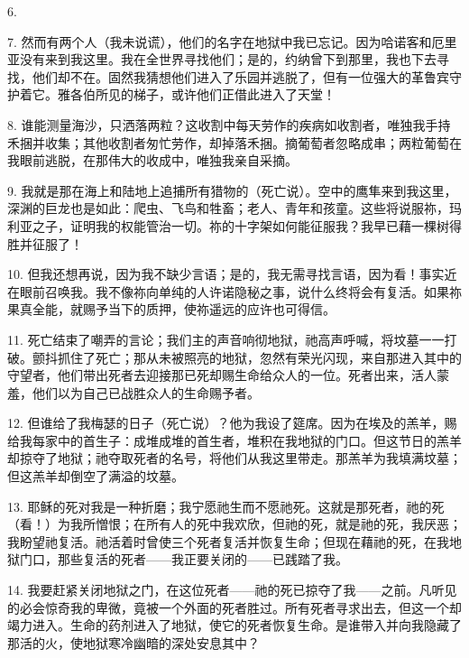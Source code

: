 6. \par

7. 然而有两个人（我未说谎），他们的名字在地狱中我已忘记。因为哈诺客和厄里亚没有来到我这里。我在全世界寻找他们；是的，约纳曾下到那里，我也下去寻找，他们却不在。固然我猜想他们进入了乐园并逃脱了，但有一位强大的革鲁宾守护着它。雅各伯所见的梯子，或许他们正借此进入了天堂！\par

8. 谁能测量海沙，只洒落两粒？这收割中每天劳作的疾病如收割者，唯独我手持禾捆并收集；其他收割者匆忙劳作，却掉落禾捆。摘葡萄者忽略成串；两粒葡萄在我眼前逃脱，在那伟大的收成中，唯独我亲自采摘。\par

9. 我就是那在海上和陆地上追捕所有猎物的（死亡说）。空中的鹰隼来到我这里，深渊的巨龙也是如此：爬虫、飞鸟和牲畜；老人、青年和孩童。这些将说服祢，玛利亚之子，证明我的权能管治一切。祢的十字架如何能征服我？我早已藉一棵树得胜并征服了！\par

10. 但我还想再说，因为我不缺少言语；是的，我无需寻找言语，因为看！事实近在眼前召唤我。我不像祢向单纯的人许诺隐秘之事，说什么终将会有复活。如果祢果真全能，就赐予当下的质押，使祢遥远的应许也可得信。\par

11. 死亡结束了嘲弄的言论；我们主的声音响彻地狱，祂高声呼喊，将坟墓一一打破。颤抖抓住了死亡；那从未被照亮的地狱，忽然有荣光闪现，来自那进入其中的守望者，他们带出死者去迎接那已死却赐生命给众人的一位。死者出来，活人蒙羞，他们以为自己已战胜众人的生命赐予者。\par

12. 但谁给了我梅瑟的日子（死亡说）？他为我设了筵席。因为在埃及的羔羊，赐给我每家中的首生子：成堆成堆的首生者，堆积在我地狱的门口。但这节日的羔羊却掠夺了地狱；祂夺取死者的名号，将他们从我这里带走。那羔羊为我填满坟墓；但这羔羊却倒空了满溢的坟墓。\par

13. 耶稣的死对我是一种折磨；我宁愿祂生而不愿祂死。这就是那死者，祂的死（看！）为我所憎恨；在所有人的死中我欢欣，但祂的死，就是祂的死，我厌恶；我盼望祂复活。祂活着时曾使三个死者复活并恢复生命；但现在藉祂的死，在我地狱门口，那些复活的死者——我正要关闭的——已践踏了我。\par

14. 我要赶紧关闭地狱之门，在这位死者——祂的死已掠夺了我——之前。凡听见的必会惊奇我的卑微，竟被一个外面的死者胜过。所有死者寻求出去，但这一个却竭力进入。生命的药剂进入了地狱，使它的死者恢复生命。是谁带入并向我隐藏了那活的火，使地狱寒冷幽暗的深处安息其中？\par

